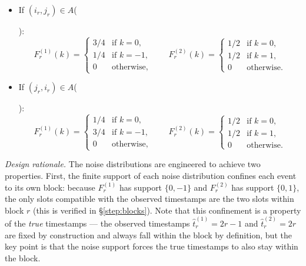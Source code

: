 \documentclass[11pt]{article}
\begin{document}
\begin{itemize}
\item If $(i_r, j_r) \in A$\;\;(%
):
\begin{equation}
F_r^{(1)}(k) = \begin{cases} 3/4 & \text{if } k = 0, \\ 1/4 & \text{if } k = -1, \\ 0 & \text{otherwise,} \end{cases}
\qquad
F_r^{(2)}(k) = \begin{cases} 1/2 & \text{if } k = 0, \\ 1/2 & \text{if } k = 1, \\ 0 & \text{otherwise.} \end{cases}
\end{equation}

\item If $(j_r, i_r) \in A$\;\;(%
):
\begin{equation}
F_r^{(1)}(k) = \begin{cases} 1/4 & \text{if } k = 0, \\ 3/4 & \text{if } k = -1, \\ 0 & \text{otherwise,} \end{cases}
\qquad
F_r^{(2)}(k) = \begin{cases} 1/2 & \text{if } k = 0, \\ 1/2 & \text{if } k = 1, \\ 0 & \text{otherwise.} \end{cases}
\end{equation}
\end{itemize}

\noindent\emph{Design rationale.} The noise distributions are engineered to achieve two properties. First, the finite support of each noise distribution confines each event to its own block: because $F_r^{(1)}$ has support $\{0, -1\}$ and $F_r^{(2)}$ has support $\{0, 1\}$, the only slots compatible with the observed timestamps are the two slots within block $r$ (this is verified in \S\ref{step:blocks}). Note that this confinement is a property of the \emph{true} timestamps --- the observed timestamps $\hat{t}_r^{(1)} = 2r-1$ and $\hat{t}_r^{(2)} = 2r$ are fixed by construction and always fall within the block by definition, but the key point is that the noise support forces the true timestamps to also stay within the block.
\end{document}
